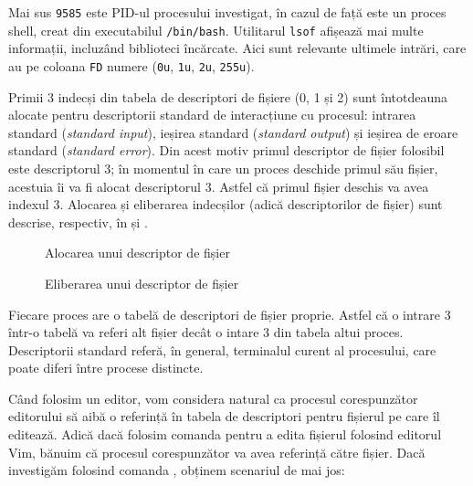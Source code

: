 Mai sus \texttt{9585} este PID-ul procesului investigat, în cazul de față este un proces shell, creat din executabilul \texttt{/bin/bash}. Utilitarul \texttt{lsof} afișează mai multe informații, incluzând biblioteci încărcate. Aici sunt relevante ultimele intrări, care au pe coloana \texttt{FD} numere (\texttt{0u}, \texttt{1u}, \texttt{2u}, \texttt{255u}).

Primii 3 indecși din tabela de descriptori de fișiere (0, 1 și 2) sunt întotdeauna alocate pentru
descriptorii standard de interacțiune cu procesul: intrarea standard (\textit{standard
input}), ieșirea standard (\textit{standard output}) și ieșirea de eroare standard
(\textit{standard error}). Din acest motiv primul descriptor de fișier folosibil este
descriptorul 3; în momentul în care un proces deschide primul său fișier,
acestuia îi va fi alocat descriptorul 3. Astfel că primul fișier deschis va avea
indexul 3. Alocarea și eliberarea indecșilor (adică descriptorilor de fișier)
sunt descrise, respectiv, în  și .

\begin{figure}[!htbp]
	\centering
	\def\svgwidth{0.8\textwidth}
	
	\caption{Alocarea unui descriptor de fișier}
	\label{fig:process-alloc-fd}
\end{figure}

\begin{figure}[!htbp]
	\centering
	\def\svgwidth{0.8\textwidth}
	
	\caption{Eliberarea unui descriptor de fișier}
	\label{fig:process-free-fd}
\end{figure}

Fiecare proces are o tabelă de descriptori de fișier proprie. Astfel că o
intrare 3 într-o tabelă va referi alt fișier decât o intare 3 din tabela altui
proces. Descriptorii standard referă, în general, terminalul curent al
procesului, care poate diferi între procese distincte.

Când folosim un editor, vom considera natural ca procesul corespunzător
editorului să aibă o referință în tabela de descriptori pentru fișierul pe care
îl editează. Adică dacă folosim comanda  pentru a edita fișierul
 folosind editorul Vim, bănuim că procesul corespunzător va avea
referință către fișier. Dacă investigăm folosind comanda , obținem scenariul
de mai jos:

